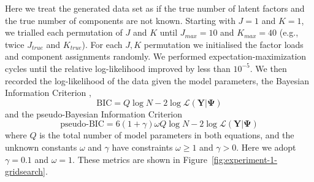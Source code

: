 \documentclass[twocolumn]{aastex61}
\newcommand{\vect}[1]{\boldsymbol{\mathbf{#1}}}
\renewcommand{\vec}[1]{\vect{#1}}
\newcommand{\data}{\textbf{Y}}
\newcommand{\NumLatentFactors}{J}
\newcommand{\NumComponents}{K}
\begin{document}
Here we treat the generated data set as if the true number of latent factors
and the true number of components are not known. Starting with $\NumLatentFactors = 1$
and $\NumComponents = 1$, we trialled each permutation of $\NumLatentFactors$ and $\NumComponents$
until $\NumLatentFactors_{max} = 10$
and   $\NumComponents_{max} = 40$ (e.g., twice $\NumLatentFactors_{true}$ and $\NumComponents_{true}$).
For each $\NumLatentFactors,\NumComponents$ permutation we initialised the factor
loads and component assignments randomly. We performed expectation-maximization 
cycles until the relative log-likelihood improved by less than $10^{-5}$. We then
recorded the log-likelihood of the data given the model parameters, the
Bayesian Information Criterion \citep{bic}, 
\begin{equation}
	\textrm{BIC} = Q\log{N} - 2\log\mathcal{L}\left(\data|\vec\Psi\right) \label{eq:bic}
\end{equation} 
\noindent{}and the pseudo-Bayesian Information Criterion \citep{pseudo-bic}
\begin{equation}
 \textrm{pseudo-BIC} = 6(1 + \gamma)\omega{}Q\log{N} - 2\log\mathcal{L}\left(\data|\vec\Psi\right) \label{eq:pseudo-bic}
\end{equation}
\noindent{}where $Q$ is the total number of model parameters in both equations,
and the unknown constants $\omega$ and $\gamma$ have constraints
$\omega \geq 1$ and $\gamma > 0$. Here we adopt $\gamma = 0.1$ and $\omega = 1$.
These metrics are shown in Figure~\ref{fig:experiment-1-gridsearch}.
\end{document}
